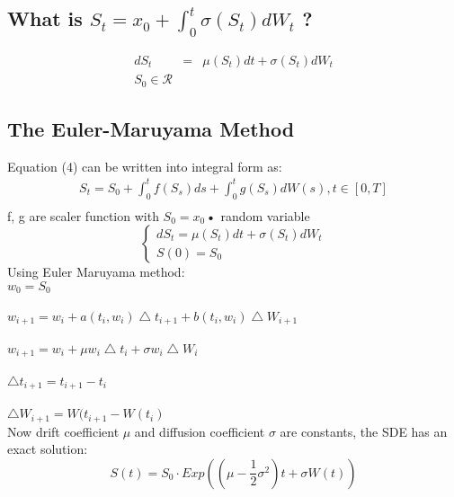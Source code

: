 \subsection{ What is $S_t = x_0 + \int_0^t \sigma\left(S_t\right)dW_t$ ?}

\begin{equation}
\begin{array}{rcl}
dS_t &=& \mu(S_t)dt+\sigma(S_t)dW_t\\
S_0 \in \mathcal{R}
\end{array}
\end{equation}
\subsection{The Euler-Maruyama Method}
Equation (4) can be written into integral form as:\\
\begin{equation}
\begin{array}{rcl}
S_t =S_0+ \int_0^t f\left(S_s\right)ds +\int_0^t g\left(S_s\right)dW(s),      t\in [0,T]\\
\end{array}
\end{equation}
f, g are scaler function with $S_0 = x_0$\textbf{•} random variable\\
$$\begin{cases}
dS_t = \mu(S_t)dt+\sigma(S_t)dW_t\\
S(0) = S_0
\end{cases}$$
 Using Euler Maruyama method:\\
 $w_0 = S_0$\\\\
 $w_{i+1} = w_i+a(t_i,w_i) \bigtriangleup t_{i+1}+b(t_i,w_i)\bigtriangleup W_{i+1}$\\\\
 $w_{i+1} = w_i+\mu w_i \bigtriangleup t_i+\sigma w_i\bigtriangleup W_i$\\\\
 $\bigtriangleup t_{i+1} = t_{i+1}-t_i$\\\\
 $\bigtriangleup W_{i+1} = W(t_{i+1}-W(t_i)$\\
Now drift coefficient $\mu$ and diffusion coefficient $\sigma$ are constants, the SDE has an exact solution:
\begin{equation}\label{eqnModelling7-2}
S(t) = S_0 \cdot Exp \left( \left( \mu - \frac{1}{2} \sigma^2 \right)t + \sigma W(t) \right) 
\end{equation} 

